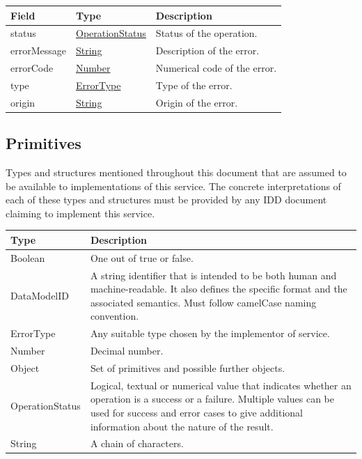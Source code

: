 \documentclass[a4paper]{arrowhead}
\newcommand{\pdef}[1]{{\textcolor{ArrowheadGrey}{#1\label{sec:model:primitives:#1}\label{sec:model:primitives:#1s}\label{sec:model:primitives:#1es}}}}
\newcommand{\pref}[1]{{\textcolor{ArrowheadGrey}{\hyperref[sec:model:primitives:#1]{#1}}}}
\begin{document}
\clearpage


\begin{table}[ht!]
\begin{tabularx}{\textwidth}{| p{4.25cm} | p{3.5cm} | X |} \hline
\rowcolor{gray!33} Field & Type      & Description \\ \hline
status & \pref{OperationStatus} & Status of the operation. \\ \hline
errorMessage & \pref{String} & Description of the error. \\ \hline
errorCode &\pref{Number}  & Numerical code of the error. \\ \hline
type & \pref{ErrorType} & Type of the error. \\ \hline
origin & \pref{String} & Origin of the error. \\ \hline
\end{tabularx}
\end{table}

\clearpage

\subsection{Primitives}
\label{sec:model:primitives}

Types and structures mentioned throughout this document that are assumed to be available to implementations of this service.
The concrete interpretations of each of these types and structures must be provided by any IDD document claiming to implement this service.


\begin{table}[ht!]
\begin{tabularx}{\textwidth}{| p{3cm} | X |} \hline
\rowcolor{gray!33} Type & Description \\ \hline
\pdef{Boolean}          &  One out of true or false. \\ \hline
\pdef{DataModelID}      & A string identifier that is intended to be both human and machine-readable. It also defines the specific format and the associated semantics. Must follow camelCase naming convention. \\ \hline
\pdef{ErrorType}        & Any suitable type chosen by the implementor of service. \\ \hline
\pdef{Number}           & Decimal number. \\ \hline
\pdef{Object}           & Set of primitives and possible further objects. \\ \hline
\pdef{OperationStatus}  & Logical, textual or numerical value that indicates whether an operation is a success or a failure. Multiple values can be used for success and error cases to give additional information about the nature of the result. \\ \hline
\pdef{String}           & A chain of characters. \\ \hline
\end{tabularx}
\end{table}
\end{document}

